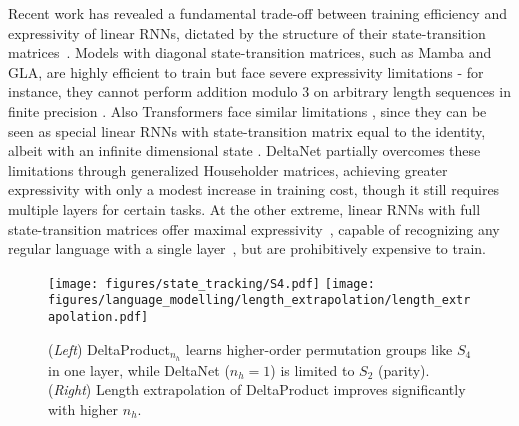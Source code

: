 \documentclass{article} %
\begin{document}
Recent work has revealed a fundamental trade-off  between training efficiency and expressivity of linear RNNs, dictated by the structure of their state-transition matrices~\citep{merrill-icml24a,sarrof-neurips24a,grazzi-iclr25a}. Models with diagonal  state-transition matrices, such as Mamba and GLA, are highly efficient to train but face severe expressivity limitations - for instance, they cannot perform addition modulo 3 on arbitrary length sequences in finite precision \citep[Theorem 2]{grazzi-iclr25a}.
Also Transformers face similar limitations \citep{hahn2020theoretical,merrill2023parallelism}, since they can be seen as special linear RNNs with state-transition matrix equal to the identity, albeit with an infinite dimensional state \citep{katharopoulos-icml20a}.
DeltaNet partially overcomes these limitations through generalized Householder matrices, achieving greater expressivity with only a modest increase in training cost, though it still requires multiple layers for certain tasks. At the other extreme, linear RNNs with full state-transition matrices offer maximal expressivity~\citep{cirone-neurips24a}, capable of recognizing any regular language with a single layer~\citep{merrill-icml24a}, but are prohibitively expensive to train.
\begin{figure}[t]
\centering
\begin{minipage}[b]{0.62\textwidth}
  \centering
  \texttt{[image: figures/state\_tracking/S4.pdf]} \hspace{2mm}
  \texttt{[image: figures/language\_modelling/length\_extrapolation/length\_extrapolation.pdf]}
\end{minipage}
\hfill
\begin{minipage}[b]{0.34\textwidth}
  \caption{(\textit{Left}) DeltaProduct$_{n_h}$ learns higher-order permutation groups like $S_4$ in one layer, 
    while DeltaNet ($n_h{=}1$) is limited to $S_2$ (parity). 
    (\textit{Right}) Length extrapolation of DeltaProduct improves significantly with higher $n_h$.}\vspace{3mm}
  \label{fig:motivation}
\end{minipage}
\end{figure}
\end{document}
